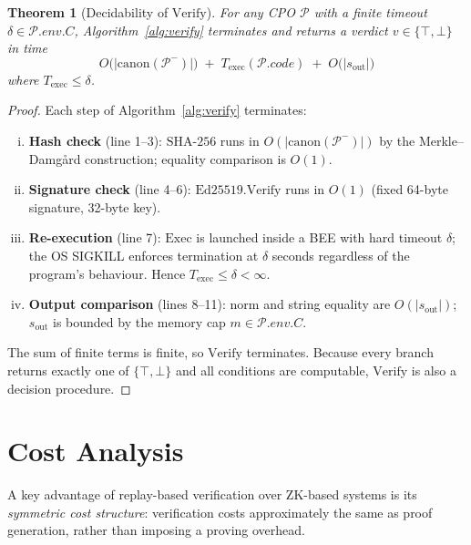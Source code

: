\documentclass[11pt]{article}
\newtheorem{theorem}{Theorem}
\begin{document}
\begin{theorem}[Decidability of $\mathrm{Verify}$]
\label{thm:decidable}
For any CPO $\mathcal{P}$ with a finite timeout $\delta \in \mathcal{P}.\mathit{env}.C$,
Algorithm~\ref{alg:verify} terminates and returns a verdict
$v \in \{\top, \bot\}$ in time
\[
  O\!\bigl(|\mathrm{canon}(\mathcal{P}^-)|\bigr)
  \;+\; T_{\mathrm{exec}}(\mathcal{P}.\textit{code})
  \;+\; O\!\bigl(|s_{\mathrm{out}}|\bigr)
\]
where $T_{\mathrm{exec}} \leq \delta$.
\end{theorem}
\begin{proof}
Each step of Algorithm~\ref{alg:verify} terminates:
\begin{enumerate}[(i)]
  \item \textbf{Hash check} (line 1--3): $\mathrm{SHA\text{-}256}$ runs in
        $O(|\mathrm{canon}(\mathcal{P}^-)|)$ by the Merkle–Damg\r{a}rd
        construction; equality comparison is $O(1)$.
  \item \textbf{Signature check} (line 4--6):
        $\mathrm{Ed25519.Verify}$ runs in $O(1)$ (fixed 64-byte signature,
        32-byte key).
  \item \textbf{Re-execution} (line 7):  $\mathrm{Exec}$ is launched inside a
        BEE with hard timeout $\delta$; the OS SIGKILL enforces termination
        at $\delta$ seconds regardless of the program's behaviour.  Hence
        $T_{\mathrm{exec}} \leq \delta < \infty$.
  \item \textbf{Output comparison} (lines 8--11): $\mathrm{norm}$ and string
        equality are $O(|s_{\mathrm{out}}|)$; $s_{\mathrm{out}}$ is bounded
        by the memory cap $m \in \mathcal{P}.\mathit{env}.C$.
\end{enumerate}
The sum of finite terms is finite, so $\mathrm{Verify}$ terminates.  Because
every branch returns exactly one of $\{\top, \bot\}$ and all conditions are
computable, $\mathrm{Verify}$ is also a decision procedure.
\end{proof}

\section{Cost Analysis}
\label{sec:cost}

A key advantage of replay-based verification over ZK-based systems is its
\emph{symmetric cost structure}: verification costs approximately the same
as proof generation, rather than imposing a proving overhead.
\end{document}
